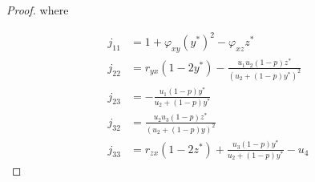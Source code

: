 \begin{proof}
    where
    
    \begin{align*}
        j_{11} &= 1+\varphi_{xy}\left(y^*\right)^2-\varphi_{xz}z^*\\
        j_{22} &= r_{yx}\left(1-2y^*\right)-\frac{u_1u_2\left(1-p\right)z^*}{\left(u_2+\left(1-p\right)y^*\right)^2}\\
        j_{23} &= -\frac{u_1\left(1-p\right)y^*}{u_2+\left(1-p\right)y^*}\\
        j_{32} &= \frac{u_2u_3\left(1-p\right)z^*}{\left(u_2+\left(1-p\right)y\right)^2}\\
        j_{33} &= r_{zx}\left(1-2z^*\right)+\frac{u_3\left(1-p\right)y^*}{u_2+\left(1-p\right)y^*}-u_4
    \end{align*}
\end{proof}

